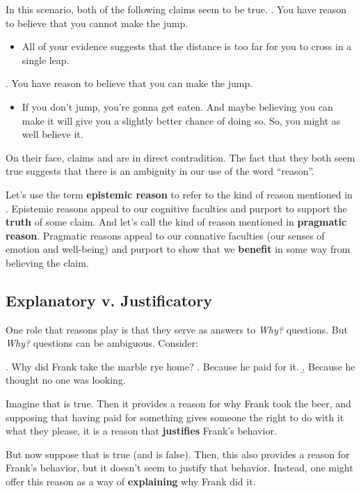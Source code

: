 \documentclass[10pt]{article}
\begin{document}
In this scenario, both of the following claims seem to be true.
\ex. You have reason to believe that you cannot make the jump.

 \begin{itemize}
  \item All of your evidence suggests that the distance is too far for you to cross in a single leap.
 \end{itemize}
 
\ex. You have reason to believe that you can make the jump.

 \begin{itemize}
  \item If you don't jump, you're gonna get eaten.  And maybe believing you can make it will give you a slightly better chance of doing so. So, you might as well believe it.
 \end{itemize}

On their face, claims \LLast and \Last are in direct contradition. The fact that they both seem true suggests that there is an ambiguity in our use of the word ``reason''.

Let's use the term \textbf{epistemic reason} to refer to the kind of reason mentioned in \LLast.  Epistemic reasons appeal to our cognitive faculties and purport to support the \textbf{truth} of some claim.  And let's call the kind of reason mentioned in \Last \textbf{pragmatic reason}.  Pragmatic reasons appeal to our connative faculties (our senses of emotion and well-being) and purport to show that we \textbf{benefit} in some way from believing the claim.

\subsection{Explanatory v. Justificatory}
One role that reasons play is that they serve as answers to \textit{Why?} questions.  But \textit{Why?} questions can be ambiguous.  Consider:

\ex. Why did Frank take the marble rye home?
\a. Because he paid for it.
\b. Because he thought no one was looking.

Imagine that \Last[a] is true. Then it provides a reason for why Frank took the beer, and supposing that having paid for something gives someone the right to do with it what they please, it is a reason that \textbf{justifies} Frank's behavior.

But now suppose that \Last[b] is true (and \Last[a] is false). Then, this also provides a reason for Frank's behavior, but it doesn't seem to justify that behavior.  Instead, one might offer this reason as a way of \textbf{explaining} why Frank did it.
\end{document}
